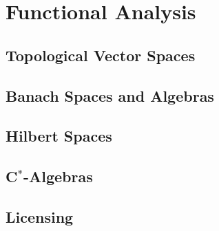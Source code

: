 \part{Functional Analysis}
\chapter{Topological Vector Spaces}
\label{chpt:topological-vector-spaces}









\chapter{Banach Spaces and Algebras}




\chapter{Hilbert Spaces}
\label{chpt:hilbert-spaces}




 





\chapter{C$^*$-Algebras}
\label{chpt:c*-algebras}





\newpage 



\ohead{}

\chapter*{Licensing}
\label{chapt:licenses}

%



